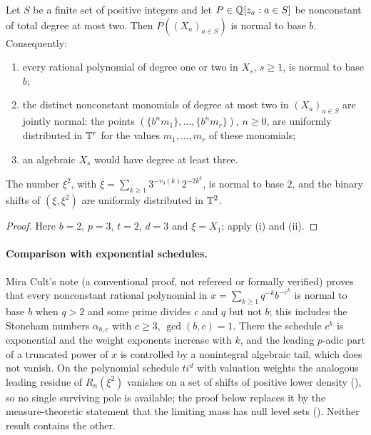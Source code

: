 \documentclass[11pt]{article}
\newcommand{\fr}[1]{\{#1\}}
\begin{document}
\begin{theorem}\label{thm:quadratic}
Let $S$ be a finite set of positive integers and let $P\in\mathbb Q[z_a:a\in S]$ be nonconstant of total
degree at most two. Then $P((X_a)_{a\in S})$ is normal to base $b$. Consequently:
\begin{enumerate}[label=\textup{(\roman*)},nosep]
\item every rational polynomial of degree one or two in $X_s$, $s\ge1$, is normal to base $b$;
\item the distinct nonconstant monomials of degree at most two in $(X_a)_{a\in S}$ are jointly normal:
the points $(\fr{b^nm_1},\ldots,\fr{b^nm_r})$, $n\ge0$, are uniformly distributed in $\mathbb T^r$ for the
values $m_1,\ldots,m_r$ of these monomials;
\item an algebraic $X_s$ would have degree at least three.
\end{enumerate}
\end{theorem}

\begin{corollary}\label{cor:flagship}
The number $\xi^2$, with $\xi=\sum_{k\ge1}3^{-v_3(k)}2^{-2k^3}$, is normal to base $2$, and the binary
shifts of $(\xi,\xi^2)$ are uniformly distributed in $\mathbb T^2$.
\end{corollary}

\begin{proof}
Here $b=2$, $p=3$, $t=2$, $d=3$ and $\xi=X_1$; apply (i) and (ii).
\end{proof}

\paragraph{Comparison with exponential schedules.} Mira Cult's note \cite[Theorem~1.1]{MiraPoly}
(a conventional proof, not refereed or formally verified) proves that every nonconstant rational
polynomial in $x=\sum_{k\ge1}q^{-k}b^{-c^k}$ is normal to base $b$ when $q>2$ and some prime divides $c$
and $q$ but not $b$; this includes the Stoneham numbers $\alpha_{b,c}$ with $c\ge3$, $\gcd(b,c)=1$.
There the schedule $c^k$ is exponential and the weight exponents increase with $k$, and the leading
$p$-adic part of a truncated power of $x$ is controlled by a nonintegral algebraic tail, which does not
vanish. On the polynomial schedule $ti^d$ with valuation weights the analogous leading residue of
$R_n(\xi^2)$ vanishes on a set of shifts of positive lower density (), so no single
surviving pole is available; the proof below replaces it by the measure-theoretic statement that the
limiting mass has null level sets (). Neither result contains the other.
\end{document}
